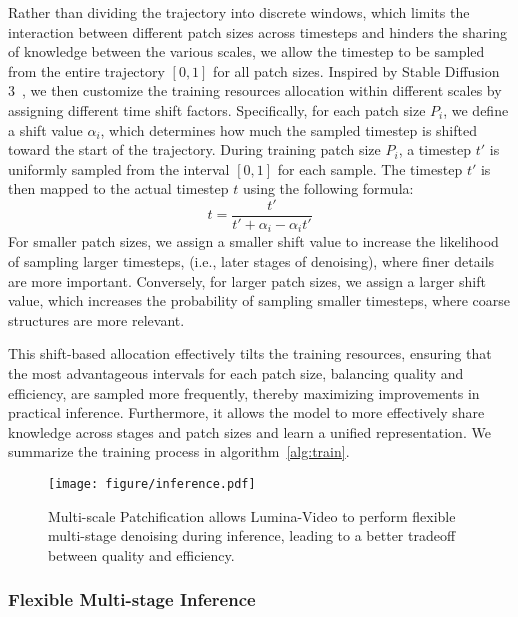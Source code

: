 Rather than dividing the trajectory into discrete windows, which limits the interaction between different patch sizes across timesteps and hinders the sharing of knowledge between the various scales, we allow the timestep to be sampled from the entire trajectory $[0,1]$ for all patch sizes. Inspired by Stable Diffusion 3~\citep{sd3}, we then customize the training resources allocation within different scales by assigning different time shift factors.
Specifically, for each patch size $P_i$, we define a shift value $\alpha_i$, which determines how much the sampled timestep is shifted toward the start of the trajectory. 
During training patch size $P_i$, a timestep $t'$ is uniformly sampled from the interval $[0,1]$ for each sample. The timestep $t'$ is then mapped to the actual timestep $t$ using the following formula:
\begin{equation}
    \label{eq:timeshift}
    t = \frac{t'}{t' + \alpha_i - \alpha_i t' }
\end{equation}
For smaller patch sizes, we assign a smaller shift value to increase the likelihood of sampling larger timesteps, (i.e., later stages of denoising), where finer details are more important. 
Conversely, for larger patch sizes, we assign a larger shift value, which increases the probability of sampling smaller timesteps, where coarse structures are more relevant. 

This shift-based allocation effectively tilts the training resources, ensuring that the most advantageous intervals for each patch size, balancing quality and efficiency, are sampled more frequently, thereby maximizing improvements in practical inference.
Furthermore, it allows the model to more effectively share knowledge across stages and patch sizes and learn a unified representation. We summarize the training process in algorithm~\ref{alg:train}.

\begin{figure}[t]
    \centering
    \texttt{[image: figure/inference.pdf]}
    \vspace{-0.5em}
    \caption{Multi-scale Patchification allows Lumina-Video to perform flexible multi-stage denoising during inference, leading to a better tradeoff between quality and efficiency.}
    \vspace{-1em}
    \label{fig:inference}
\end{figure}
\subsubsection{Flexible Multi-stage Inference}

